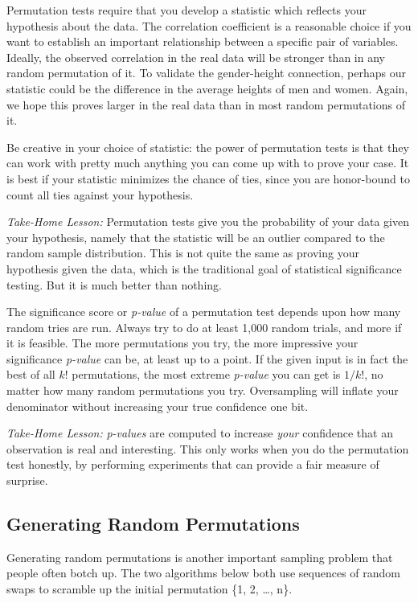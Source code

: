 \documentclass[10pt]{article}
\begin{document}
Permutation tests require that you develop a statistic which reflects your hypothesis about the data. The correlation coefficient is a reasonable choice if you want to establish an important relationship between a specific pair of variables. Ideally, the observed correlation in the real data will be stronger than in any random permutation of it. To validate the gender-height connection, perhaps our statistic could be the difference in the average heights of men and women. Again, we hope this proves larger in the real data than in most random permutations of it.

Be creative in your choice of statistic: the power of permutation tests is that they can work with pretty much anything you can come up with to prove your case. It is best if your statistic minimizes the chance of ties, since you are honor-bound to count all ties against your hypothesis.

\textit{Take-Home Lesson:} Permutation tests give you the probability of your data given your hypothesis, namely that the statistic will be an outlier compared to the random sample distribution. This is not quite the same as proving your hypothesis given the data, which is the traditional goal of statistical significance testing. But it is much better than nothing.

The significance score or \textit{p-value} of a permutation test depends upon how many random tries are run. Always try to do at least 1,000 random trials, and more if it is feasible. The more permutations you try, the more impressive your significance \textit{p-value} can be, at least up to a point. If the given input is in fact the best of all $k!$ permutations, the most extreme \textit{p-value} you can get is $1/k!$, no matter how many random permutations you try. Oversampling will inflate your denominator without increasing your true confidence one bit.

\textit{Take-Home Lesson:} \textit{p-values} are computed to increase \textit{your} confidence that an observation is real and interesting. This only works when you do the permutation test honestly, by performing experiments that can provide a fair measure of surprise.

\subsection{Generating Random Permutations}

Generating random permutations is another important sampling problem that people often botch up. The two algorithms below both use sequences of random swaps to scramble up the initial permutation \{1, 2, \ldots, n\}.
\end{document}
